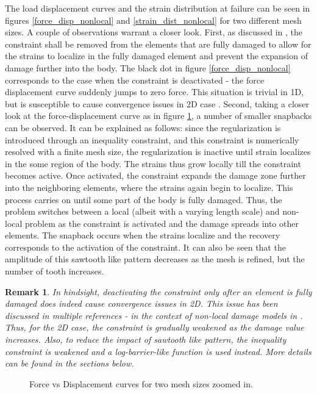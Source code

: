 \documentclass[11pt]{elsarticle}
\newtheorem*{remark}{Remark}
\begin{document}
The load displacement curves and the strain distribution at failure can be seen in figures \ref{force_disp_nonlocal} and \ref{strain_dist_nonlocal} for two different mesh sizes. A couple of observations warrant a closer look. First, as discussed in \cite{Kamasamudram2023s}, the constraint shall be removed from the elements that are fully damaged to allow for the strains to localize in the fully damaged element and prevent the expansion of damage further into the body. The black dot in figure \ref{force_disp_nonlocal} corresponds to the case when the constraint is deactivated - the force displacement curve suddenly jumps to zero force. This situation is trivial in 1D, but is susceptible to cause convergence issues in 2D case \cite{geersarticle}. Second, taking a closer look at the force-displacement curve as in figure \ref{force_disp_nonlocal_zoom}, a number of smaller snapbacks can be observed. It can be explained as follows: since the regularization is introduced through an inequality constraint, and this constraint is numerically resolved with a finite mesh size, the regularization is inactive until strain localizes in the some region of the body. The strains thus grow locally till the constraint becomes active. Once activated, the constraint expands the damage zone further into the neighboring elements, where the strains again begin to localize. This process carries on until some part of the body is fully damaged. Thus, the problem switches between a local (albeit with a varying length scale) and non-local problem as the constraint is activated and the damage spreads into other elements. The snapback occurs when the strains localize and the recovery corresponds to the activation of the constraint. It can also be seen that the amplitude of this sawtooth like pattern decreases as the mesh is refined, but the number of tooth increases.


\begin{remark}
	In hindsight, deactivating the constraint only after an element is fully damaged does indeed cause convergence issues in 2D. This issue has been discussed in multiple references - in the context of non-local damage models in \cite{Geers1998}. Thus, for the 2D case, the constraint is gradually weakened as the damage value increases. Also, to reduce the impact of sawtooth like pattern, the inequality constraint is weakened and a log-barrier-like function is used instead. More details can be found in the sections below.
\end{remark}


\begin{figure}[ht]
	\centering
	
	\caption{Force vs Displacement curves for two mesh sizes zoomed in.}
	\label{force_disp_nonlocal_zoom}
\end{figure}
\end{document}
